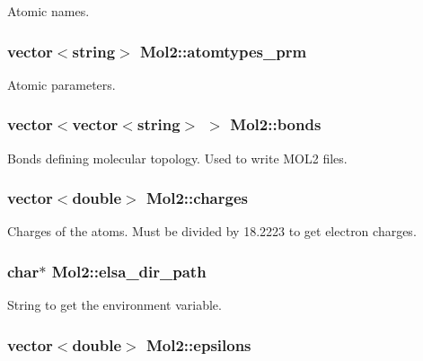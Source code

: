 Atomic names. 

\hypertarget{classMol2_a6bda0cb634fcad4bc779b68e15e4862a}{
\subsubsection[{atomtypes\_\-prm}]{\setlength{\rightskip}{0pt plus 5cm}vector$<$string$>$ {\bf Mol2::atomtypes\_\-prm}}}
\label{classMol2_a6bda0cb634fcad4bc779b68e15e4862a}


Atomic parameters. 

\hypertarget{classMol2_a3be83bf91977f14cd2b8d2d9571f770f}{
\subsubsection[{bonds}]{\setlength{\rightskip}{0pt plus 5cm}vector$<$vector$<$string$>$ $>$ {\bf Mol2::bonds}}}
\label{classMol2_a3be83bf91977f14cd2b8d2d9571f770f}


Bonds defining molecular topology. Used to write MOL2 files. 

\hypertarget{classMol2_a85429e831336c4f3044b6cc879a8b656}{
\subsubsection[{charges}]{\setlength{\rightskip}{0pt plus 5cm}vector$<$double$>$ {\bf Mol2::charges}}}
\label{classMol2_a85429e831336c4f3044b6cc879a8b656}


Charges of the atoms. Must be divided by 18.2223 to get electron charges. 

\hypertarget{classMol2_ab7f7de6a9bd8dc025659a9db852943ba}{
\subsubsection[{elsa\_\-dir\_\-path}]{\setlength{\rightskip}{0pt plus 5cm}char$\ast$ {\bf Mol2::elsa\_\-dir\_\-path}}}
\label{classMol2_ab7f7de6a9bd8dc025659a9db852943ba}


String to get the environment variable. 

\hypertarget{classMol2_adcc95358a2c491ac6a14a30044787472}{
\subsubsection[{epsilons}]{\setlength{\rightskip}{0pt plus 5cm}vector$<$double$>$ {\bf Mol2::epsilons}}}
\label{classMol2_adcc95358a2c491ac6a14a30044787472}



